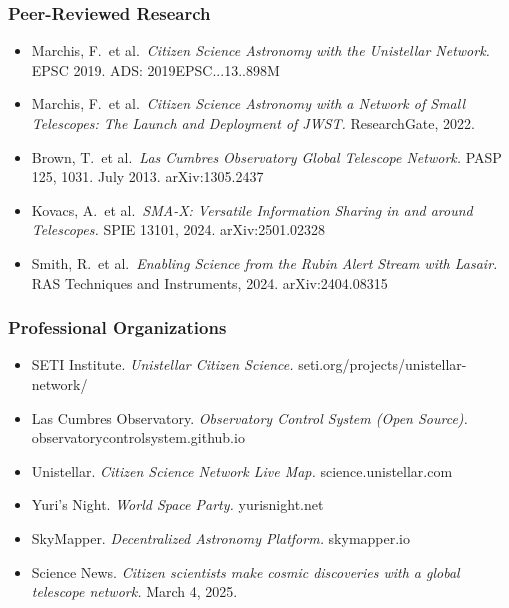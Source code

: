 \documentclass[11pt,letterpaper]{article}
\newcommand{\stageheader}[2]{%
  \noindent\colorbox{#2}{\makebox[\textwidth][l]{%
    \textcolor{white}{\bfseries\sffamily\hspace{6pt}#1\hspace{6pt}}}}%
  \vspace{0.5em}\par%
}
\begin{document}
\subsubsection{Peer-Reviewed Research}

\begin{itemize}
  \item Marchis, F.\ et al.\ \textit{Citizen Science Astronomy with the Unistellar Network.} EPSC 2019. ADS: 2019EPSC...13..898M
  \item Marchis, F.\ et al.\ \textit{Citizen Science Astronomy with a Network of Small Telescopes: The Launch and Deployment of JWST.} ResearchGate, 2022.
  \item Brown, T.\ et al.\ \textit{Las Cumbres Observatory Global Telescope Network.} PASP 125, 1031. July 2013. arXiv:1305.2437
  \item Kovacs, A.\ et al.\ \textit{SMA-X: Versatile Information Sharing in and around Telescopes.} SPIE 13101, 2024. arXiv:2501.02328
  \item Smith, R.\ et al.\ \textit{Enabling Science from the Rubin Alert Stream with Lasair.} RAS Techniques and Instruments, 2024. arXiv:2404.08315
\end{itemize}

\subsubsection{Professional Organizations}

\begin{itemize}
  \item SETI Institute. \textit{Unistellar Citizen Science.} seti.org/projects/unistellar-network/
  \item Las Cumbres Observatory. \textit{Observatory Control System (Open Source).} observatorycontrolsystem.github.io
  \item Unistellar. \textit{Citizen Science Network Live Map.} science.unistellar.com
  \item Yuri's Night. \textit{World Space Party.} yurisnight.net
  \item SkyMapper. \textit{Decentralized Astronomy Platform.} skymapper.io
  \item Science News. \textit{Citizen scientists make cosmic discoveries with a global telescope network.} March 4, 2025.
\end{itemize}

\newpage

\stageheader{STAGE 3 --- MISSION PACKAGE}{tertiary}
\end{document}
